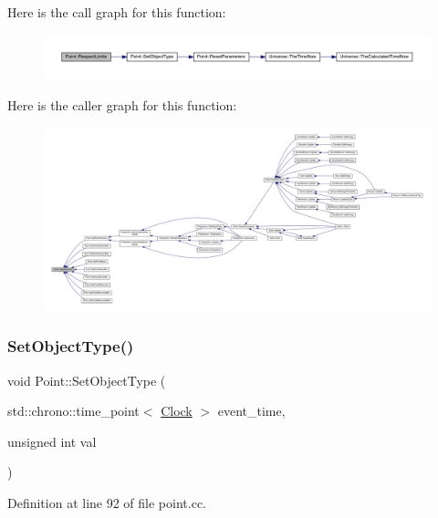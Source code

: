 Here is the call graph for this function\+:
\nopagebreak
\begin{figure}[H]
\begin{center}
\leavevmode
\includegraphics[width=350pt]{class_point_ac3e94cb7e2ab1d6008ff1d5df00641c2_cgraph}
\end{center}
\end{figure}
Here is the caller graph for this function\+:
\nopagebreak
\begin{figure}[H]
\begin{center}
\leavevmode
\includegraphics[width=350pt]{class_point_ac3e94cb7e2ab1d6008ff1d5df00641c2_icgraph}
\end{center}
\end{figure}
\mbox{\label{class_point_a3afeb2d7a2e2b7d9406a57fefa1af2ee}} 
\subsubsection{\texorpdfstring{Set\+Object\+Type()}{SetObjectType()}}
{\footnotesize\ttfamily void Point\+::\+Set\+Object\+Type (\begin{DoxyParamCaption}\item[{std\+::chrono\+::time\+\_\+point$<$ \hyperlink{universe_8h_a0ef8d951d1ca5ab3cfaf7ab4c7a6fd80}{Clock} $>$}]{event\+\_\+time,  }\item[{unsigned int}]{val }\end{DoxyParamCaption})}



Definition at line 92 of file point.\+cc.


